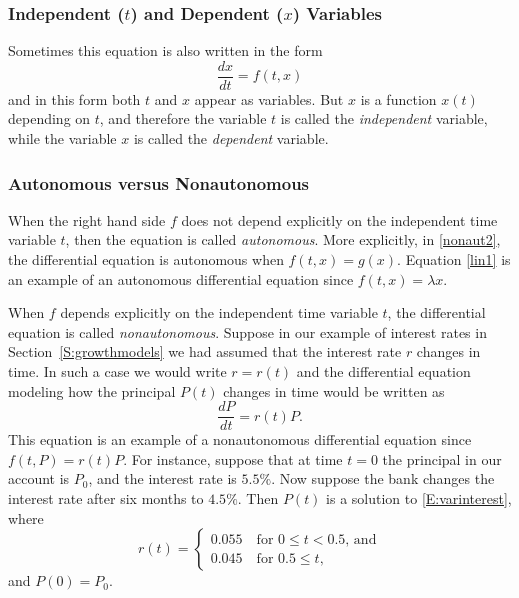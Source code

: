 \documentclass{ximera}
\begin{document}
\subsubsection*{Independent ($t$) and Dependent ($x$) Variables}

Sometimes this equation is also written in the form
\begin{equation}  \label{nonaut2}
	\frac{dx}{dt} = f(t,x)
\end{equation}
and in this form both $t$ and $x$ appear as variables.  But $x$
is a function $x(t)$ depending on $t$, and therefore the
variable $t$ is called the {\em independent\/}
 variable, while the variable $x$ is
called the {\em dependent\/}  variable.

\subsubsection*{Autonomous versus Nonautonomous}

When the right hand side $f$ does not depend explicitly on the
independent time variable $t$, then the equation is called {\em
autonomous\/}.
More explicitly, in
\eqref{nonaut2}, the differential equation is autonomous when
$f(t,x)=g(x)$.  Equation \eqref{lin1} is an example of an
autonomous differential equation since $f(t,x)=\lambda x$.

When $f$ depends explicitly on the independent time variable $t$,
the differential equation is called {\em nonautonomous\/}.
Suppose in our example of interest rates  in Section~\ref{S:growthmodels}
we had assumed that the interest rate $r$ changes in time.  In
such a case we would write $r=r(t)$ and the differential equation modeling 
how the principal $P(t)$ changes in time would be written as
\begin{equation}  \label{E:varinterest}
\frac{dP}{dt} = r(t)P.
\end{equation}
This equation is an example of a nonautonomous differential equation 
since $f(t,P) = r(t)P$.   For instance, suppose that at time $t=0$ the
principal in our account is $P_0$, and the interest rate is $5.5\%$.  
Now suppose the bank changes the interest rate after six months to $4.5\%$. 
Then $P(t)$ is a solution to \eqref{E:varinterest}, where
\[
  r(t) = \left\{\begin{array}{l}
     0.055\quad\mbox{for $0\le t < 0.5$, and}\\
     0.045\quad\mbox{for $0.5\le t$,}
  \end{array}\right.
\]
and $P(0)=P_0$.
\end{document}
